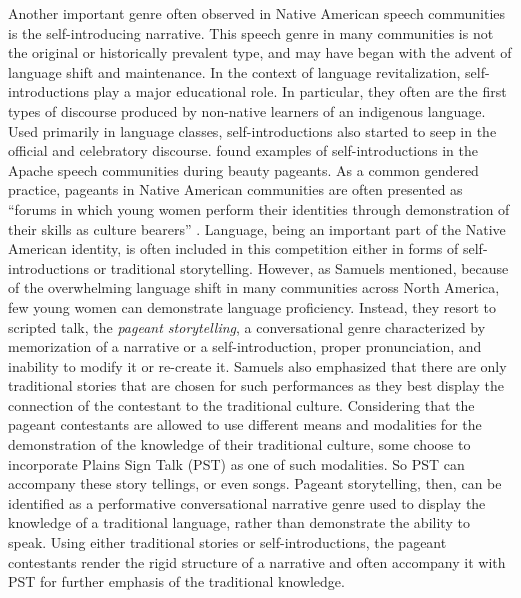 \documentclass[12pt]{article}
\begin{document}
Another important genre often observed in Native American speech communities is the self-introducing narrative. This speech genre in many communities is not the original or historically prevalent type, and may have began with the advent of language shift and maintenance. In the context of language revitalization, self-introductions play a major educational role. In particular, they often are the first types of discourse produced by non-native learners of an indigenous language. Used primarily in language classes, self-introductions also started to seep in the official and celebratory discourse. \textcite{samuels2004} found examples of self-introductions in the Apache speech communities during beauty pageants. As a common gendered practice, pageants in Native American communities are often presented as ``forums in which young women perform their identities through demonstration of their skills as culture bearers'' \parencite[p. 177]{samuels2004}. Language, being an important part of the Native American identity, is often included in this competition either in forms of self-introductions or traditional storytelling. However, as Samuels mentioned, because of the overwhelming language shift in many communities across North America, few young women can demonstrate language proficiency. Instead, they resort to scripted talk, the \textit{pageant storytelling}, a conversational genre characterized by memorization of a narrative or a self-introduction, proper pronunciation, and inability to modify it or re-create it. Samuels also emphasized that there are only traditional stories that are chosen for such performances as they best display the connection of the contestant to the traditional culture. Considering that the pageant contestants are allowed to use different means and modalities for the demonstration of the knowledge of their traditional culture, some choose to incorporate Plains Sign Talk (PST) as one of such modalities. So PST can accompany these story tellings, or even songs. Pageant storytelling, then, can be identified as a performative conversational narrative genre used to display the knowledge of a traditional language, rather than demonstrate the ability to speak. Using either traditional stories or self-introductions, the pageant contestants render the rigid structure of a narrative and often accompany it with PST for further emphasis of the traditional knowledge.
\end{document}
